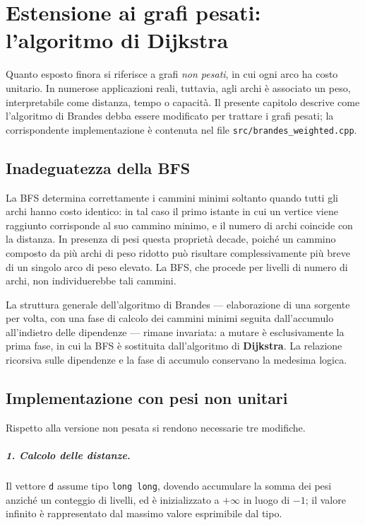 \documentclass[11pt,a4paper]{report}
\begin{document}
\chapter{Estensione ai grafi pesati: l'algoritmo di Dijkstra}

Quanto esposto finora si riferisce a grafi \emph{non pesati}, in cui ogni arco ha
costo unitario. In numerose applicazioni reali, tuttavia, agli archi è associato
un peso, interpretabile come distanza, tempo o capacità. Il presente capitolo
descrive come l'algoritmo di Brandes debba essere modificato per trattare i grafi
pesati; la corrispondente implementazione è contenuta nel file
\texttt{src/brandes\_weighted.cpp}.

\section{Inadeguatezza della BFS}

La BFS determina correttamente i cammini minimi soltanto quando
tutti gli archi hanno costo identico: in tal caso il primo istante in cui un
vertice viene raggiunto corrisponde al suo cammino minimo, e il numero di archi
coincide con la distanza. In presenza di pesi questa proprietà decade, poiché un
cammino composto da più archi di peso ridotto può risultare complessivamente più
breve di un singolo arco di peso elevato. La BFS, che procede per
livelli di numero di archi, non individuerebbe tali cammini.

La struttura generale dell'algoritmo di Brandes --- elaborazione di una sorgente
per volta, con una fase di calcolo dei cammini minimi seguita dall'accumulo
all'indietro delle dipendenze --- rimane invariata: a mutare è esclusivamente la
prima fase, in cui la BFS è sostituita dall'algoritmo di
\textbf{Dijkstra}. La relazione ricorsiva sulle dipendenze e la fase di accumulo
conservano la medesima logica.

\section{Implementazione con pesi non unitari}

Rispetto alla versione non pesata si rendono necessarie tre modifiche.

\paragraph{1. Calcolo delle distanze.} Il vettore \texttt{d}
assume tipo \texttt{long long}, dovendo accumulare la somma dei pesi anziché un
conteggio di livelli, ed è inizializzato a $+\infty$ in luogo di $-1$; il valore
infinito è rappresentato dal massimo valore esprimibile dal tipo.
\end{document}
